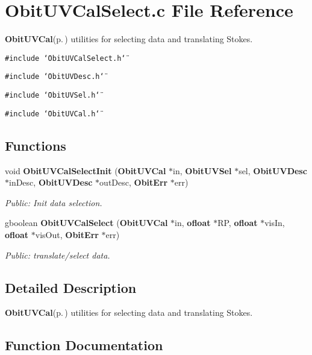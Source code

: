 \section{Obit\-UVCal\-Select.c File Reference}
\label{ObitUVCalSelect_8c}
{\bf Obit\-UVCal}{\rm (p.\,\pageref{structObitUVCal})} utilities for selecting data and translating Stokes. 

{\tt \#include \char`\"{}Obit\-UVCal\-Select.h\char`\"{}}\par
{\tt \#include \char`\"{}Obit\-UVDesc.h\char`\"{}}\par
{\tt \#include \char`\"{}Obit\-UVSel.h\char`\"{}}\par
{\tt \#include \char`\"{}Obit\-UVCal.h\char`\"{}}\par
\subsection*{Functions}
\begin{CompactItemize}
\item 
void {\bf Obit\-UVCal\-Select\-Init} ({\bf Obit\-UVCal} $\ast$in, {\bf Obit\-UVSel} $\ast$sel, {\bf Obit\-UVDesc} $\ast$in\-Desc, {\bf Obit\-UVDesc} $\ast$out\-Desc, {\bf Obit\-Err} $\ast$err)
\begin{CompactList}\small\item\em Public: Init data selection. \item\end{CompactList}\item 
gboolean {\bf Obit\-UVCal\-Select} ({\bf Obit\-UVCal} $\ast$in, {\bf ofloat} $\ast$RP, {\bf ofloat} $\ast$vis\-In, {\bf ofloat} $\ast$vis\-Out, {\bf Obit\-Err} $\ast$err)
\begin{CompactList}\small\item\em Public: translate/select data. \item\end{CompactList}\end{CompactItemize}


\subsection{Detailed Description}
{\bf Obit\-UVCal}{\rm (p.\,\pageref{structObitUVCal})} utilities for selecting data and translating Stokes. 



\subsection{Function Documentation}
